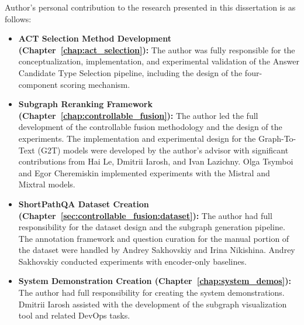 Author's personal contribution to the research presented in this dissertation is as follows:
\begin{itemize}
    \item \textbf{ACT Selection Method Development (Chapter~\ref{chap:act_selection}):} The author was fully responsible for the conceptualization, implementation, and experimental validation of the Answer Candidate Type Selection pipeline, including the design of the four-component scoring mechanism.
    \item \textbf{Subgraph Reranking Framework (Chapter~\ref{chap:controllable_fusion}):} The author led the full development of the controllable fusion methodology and the design of the experiments. The implementation and experimental design for the Graph-To-Text (G2T) models were developed by the author's advisor with significant contributions from Hai Le, Dmitrii Iarosh, and Ivan Lazichny. Olga Tsymboi and Egor Cheremiskin implemented experiments with the Mistral and Mixtral models.
    \item \textbf{ShortPathQA Dataset Creation (Chapter~\ref{sec:controllable_fusion:dataset}):} The author had full responsibility for the dataset design and the subgraph generation pipeline. The annotation framework and question curation for the manual portion of the dataset were handled by Andrey Sakhovskiy and Irina Nikishina. Andrey Sakhovskiy conducted experiments with encoder-only baselines.
    \item \textbf{System Demonstration Creation (Chapter~\ref{chap:system_demos}):} The author had full responsibility for creating the system demonstrations. Dmitrii Iarosh assisted with the development of the subgraph visualization tool and related DevOps tasks.
\end{itemize}

